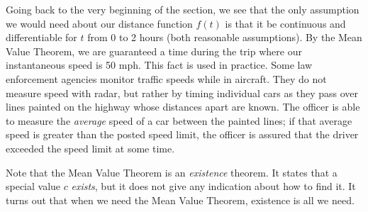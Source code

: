 Going back to the very beginning of the section, we see that the only assumption we would need about our distance function $f(t)$ is that it be continuous and differentiable for $t$ from 0 to 2 hours (both reasonable assumptions).  By the Mean Value Theorem, we are guaranteed a time during the trip where our instantaneous speed is 50 mph. This fact is used in practice. Some law enforcement agencies monitor traffic speeds while in aircraft. They do not measure speed with radar, but rather by timing individual cars as they pass over lines painted on the highway whose distances apart are known. The officer is able to measure the \textit{average} speed of a car between the painted lines; if that average speed is greater than the posted speed limit, the officer is assured that the driver exceeded the speed limit at some time.

Note that the Mean Value Theorem is an \textit{existence} theorem. It states that a special value $c$ \textit{exists}, but it does not give any indication about how to find it. It turns out that when we need the Mean Value Theorem, existence is all we need.


